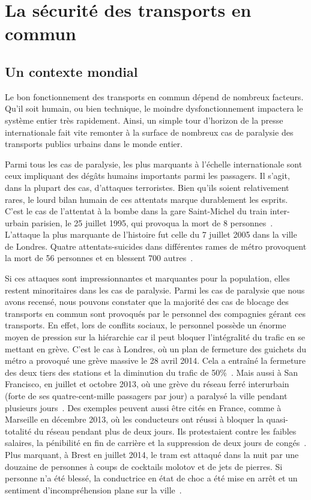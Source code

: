 \section{La sécurité des transports en commun}
    \subsection{Un contexte mondial}
        Le bon fonctionnement des transports en commun dépend de nombreux facteurs. Qu'il soit humain, ou bien technique, le moindre dysfonctionnement impactera le système entier très rapidement. Ainsi, un simple tour d'horizon de la presse internationale fait vite remonter à la surface de nombreux cas de paralysie des transports publics urbains dans le monde entier. 
             
        Parmi tous les cas de paralysie, les plus marquants à l'échelle internationale sont ceux impliquant des dégâts humains importants parmi les passagers. Il s'agit, dans la plupart des cas, d'attaques terroristes. Bien qu'ils soient relativement rares, le lourd bilan humain de ces attentats marque durablement les esprits.  C'est le cas de l'attentat à la bombe dans la gare Saint-Michel du train inter-urbain parisien, le 25 juillet 1995, qui provoqua la mort de 8 personnes~\cite{stmichel}. L'attaque la plus marquante de l'histoire fut celle du 7 juillet 2005 dans la ville de Londres. Quatre attentats-suicides dans différentes rames de métro provoquent la mort de 56 personnes et en blessent 700 autres~\cite{london_attacks}.
        
        Si ces attaques sont impressionnantes et marquantes pour la population, elles restent minoritaires dans les cas de paralysie. Parmi les cas de paralysie que nous avons recensé, nous pouvons constater que la majorité des cas de blocage des transports en commun sont provoqués par le personnel des compagnies gérant ces transports. En effet, lors de conflits sociaux, le personnel possède un énorme moyen de pression sur la hiérarchie car il peut bloquer l'intégralité du trafic en se mettant en grève.  C'est le cas à Londres, où un plan de fermeture des guichets du métro a provoqué une grève massive le 28 avril 2014. Cela a entraîné la fermeture des deux tiers des stations et la diminution du trafic de 50\%~\cite{tubeApril}. Mais aussi à San Francisco, en juillet et octobre 2013, où une grève du réseau ferré interurbain (forte de ses quatre-cent-mille passagers par jour) a paralysé la ville pendant plusieurs jours~\cite{SFbart}. Des exemples peuvent aussi être cités en France, comme à Marseille en décembre 2013, où les conducteurs ont réussi à bloquer la quasi-totalité du réseau pendant plus de deux jours. Ils protestaient contre les faibles salaires, la pénibilité en fin de carrière et la suppression de deux jours de congés~\cite{greve_marseille}. Plus marquant, à Brest en juillet 2014, le tram est attaqué dans la  nuit par une douzaine de personnes à coups de cocktails molotov et de jets de pierres. Si personne n'a été blessé, la conductrice en état de choc a été mise en arrêt et un sentiment d'incompréhension plane sur la ville~\cite{molotov}.
            
